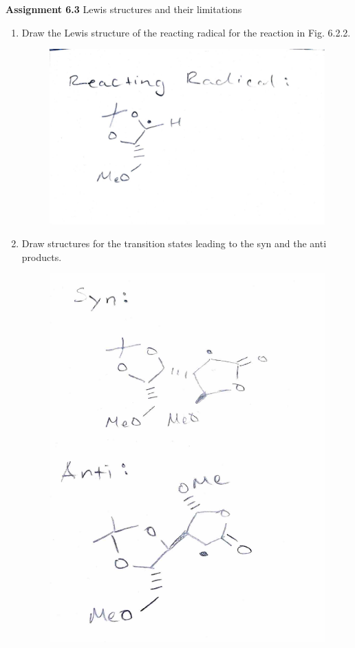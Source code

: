 \documentclass{article}
\begin{document}
\textbf{Assignment 6.3}
Lewis structures and their limitations
\begin{enumerate}
	\item Draw the Lewis structure of the reacting radical for the reaction in Fig. 6.2.2.
		\begin{figure}[h]
			\centering
			\includegraphics[width=\textwidth]{images/reacting-radical.pdf}
		\end{figure}
	\item Draw structures for the transition states leading to the syn and the anti products.
		\begin{figure}[h]
			\centering
			\includegraphics[width=\textwidth]{images/syn-anti.pdf}
		\end{figure}


\end{enumerate}
\end{document}
